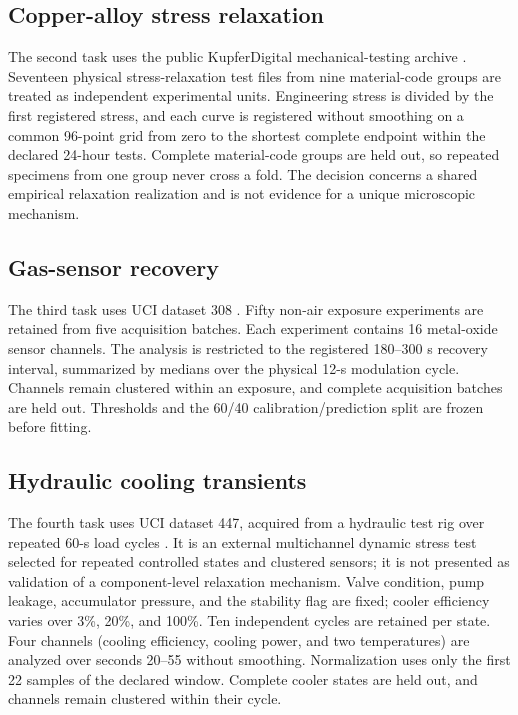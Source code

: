 \documentclass[11pt]{article}
\begin{document}
\subsection{Copper-alloy stress relaxation}
The second task uses the public KupferDigital mechanical-testing archive \cite{kupferdigital2024relaxation}. Seventeen physical stress-relaxation test files from nine material-code groups are treated as independent experimental units. Engineering stress is divided by the first registered stress, and each curve is registered without smoothing on a common 96-point grid from zero to the shortest complete endpoint within the declared 24-hour tests. Complete material-code groups are held out, so repeated specimens from one group never cross a fold. The decision concerns a shared empirical relaxation realization and is not evidence for a unique microscopic mechanism.

\subsection{Gas-sensor recovery}
The third task uses UCI dataset 308 \cite{ziyatdinov2015dataset}. Fifty non-air exposure experiments are retained from five acquisition batches. Each experiment contains 16 metal-oxide sensor channels. The analysis is restricted to the registered 180--300 s recovery interval, summarized by medians over the physical 12-s modulation cycle. Channels remain clustered within an exposure, and complete acquisition batches are held out. Thresholds and the 60/40 calibration/prediction split are frozen before fitting.

\subsection{Hydraulic cooling transients}
The fourth task uses UCI dataset 447, acquired from a hydraulic test rig over repeated 60-s load cycles \cite{helwig2015hydraulic}. It is an external multichannel dynamic stress test selected for repeated controlled states and clustered sensors; it is not presented as validation of a component-level relaxation mechanism. Valve condition, pump leakage, accumulator pressure, and the stability flag are fixed; cooler efficiency varies over 3\%, 20\%, and 100\%. Ten independent cycles are retained per state. Four channels (cooling efficiency, cooling power, and two temperatures) are analyzed over seconds 20--55 without smoothing. Normalization uses only the first 22 samples of the declared window. Complete cooler states are held out, and channels remain clustered within their cycle.
\end{document}
